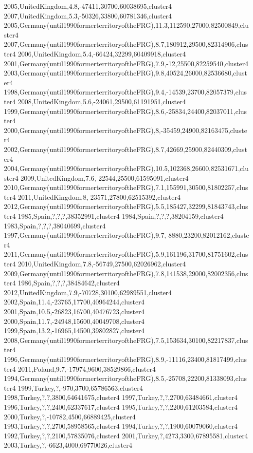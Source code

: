 2005,UnitedKingdom,4.8,-47411,30700,60038695,cluster4
2007,UnitedKingdom,5.3,-50326,33800,60781346,cluster4
2005,Germany(until1990formerterritoryoftheFRG),11.3,112590,27000,82500849,cluster4
2007,Germany(until1990formerterritoryoftheFRG),8.7,180912,29500,82314906,cluster4
2006,UnitedKingdom,5.4,-66424,32299,60409918,cluster4
2001,Germany(until1990formerterritoryoftheFRG),7.9,-12,25500,82259540,cluster4
2003,Germany(until1990formerterritoryoftheFRG),9.8,40524,26000,82536680,cluster4
1998,Germany(until1990formerterritoryoftheFRG),9.4,-14539,23700,82057379,cluster4
2008,UnitedKingdom,5.6,-24061,29500,61191951,cluster4
1999,Germany(until1990formerterritoryoftheFRG),8.6,-25834,24400,82037011,cluster4
2000,Germany(until1990formerterritoryoftheFRG),8,-35459,24900,82163475,cluster4
2002,Germany(until1990formerterritoryoftheFRG),8.7,42669,25900,82440309,cluster4
2004,Germany(until1990formerterritoryoftheFRG),10.5,102368,26600,82531671,cluster4
2009,UnitedKingdom,7.6,-22544,25500,61595091,cluster4
2010,Germany(until1990formerterritoryoftheFRG),7.1,155991,30500,81802257,cluster4
2011,UnitedKingdom,8,-23571,27800,62515392,cluster4
2012,Germany(until1990formerterritoryoftheFRG),5.5,185427,32299,81843743,cluster4
1985,Spain,?,?,?,38352991,cluster4
1984,Spain,?,?,?,38204159,cluster4
1983,Spain,?,?,?,38040699,cluster4
1997,Germany(until1990formerterritoryoftheFRG),9.7,-8880,23200,82012162,cluster4
2011,Germany(until1990formerterritoryoftheFRG),5.9,161196,31700,81751602,cluster4
2010,UnitedKingdom,7.8,-56749,27500,62026962,cluster4
2009,Germany(until1990formerterritoryoftheFRG),7.8,141538,29000,82002356,cluster4
1986,Spain,?,?,?,38484642,cluster4
2012,UnitedKingdom,7.9,-70728,30100,62989551,cluster4
2002,Spain,11.4,-23765,17700,40964244,cluster4
2001,Spain,10.5,-26823,16700,40476723,cluster4
2000,Spain,11.7,-24948,15600,40049708,cluster4
1999,Spain,13.2,-16965,14500,39802827,cluster4
2008,Germany(until1990formerterritoryoftheFRG),7.5,153634,30100,82217837,cluster4
1996,Germany(until1990formerterritoryoftheFRG),8.9,-11116,23400,81817499,cluster4
2011,Poland,9.7,-17974,9600,38529866,cluster4
1994,Germany(until1990formerterritoryoftheFRG),8.5,-25708,22200,81338093,cluster4
1999,Turkey,?,-970,3700,65786563,cluster4
1998,Turkey,?,?,3800,64641675,cluster4
1997,Turkey,?,?,2700,63484661,cluster4
1996,Turkey,?,?,2400,62337617,cluster4
1995,Turkey,?,?,2200,61203584,cluster4
2000,Turkey,?,-10782,4500,66889425,cluster4
1993,Turkey,?,?,2700,58958565,cluster4
1994,Turkey,?,?,1900,60079060,cluster4
1992,Turkey,?,?,2100,57835076,cluster4
2001,Turkey,?,4273,3300,67895581,cluster4
2003,Turkey,?,-6623,4000,69770026,cluster4
